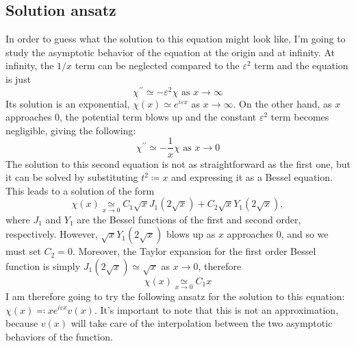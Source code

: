 \subsection{Solution ansatz}
In order to guess what the solution to this equation might look like, I'm going to study the asymptotic behavior of the equation at the origin and at infinity. At infinity, the \(1 / x\) term can be neglected compared to the \(\varepsilon ^2\) term and the equation is just
\begin{equation}
	\chi ^{\prime\prime} \simeq - \varepsilon ^2 \chi \text{ as } x \to \infty 
\end{equation}
Its solution is an exponential, \(\chi (x) \simeq e^{i \varepsilon x}\) as \(x \to \infty \). On the other hand, as \(x\) approaches \(0\), the potential term blows up and the constant \(\varepsilon ^2\) term becomes negligible, giving the following:
\begin{equation}
	\chi ^{\prime\prime} \simeq - \frac{1}{x} \chi \text{ as } x \to 0
\end{equation}
The solution to this second equation is not as straightforward as the first one, but it can be solved by substituting \(t^2\coloneqq x\) and expressing it as a Bessel equation. This leads to a solution of the form
\begin{equation}
	\chi (x) \underset{x \to 0}{\simeq} C_1 \sqrt{x} J_1 (2 \sqrt{x} ) + C_2 \sqrt{x} Y_1(2 \sqrt{x} ),
\end{equation}
where \(J_1\) and \(Y_1\) are the Bessel functions of the first and second order, respectively. However, \(\sqrt{x} Y_1 (2\sqrt{x} ) \) blows up as \(x\) approaches \(0\), and so we must set \(C_2 = 0\). Moreover, the Taylor expansion for the first order Bessel function is simply \(J_1 (2 \sqrt{x} ) \simeq \sqrt{x} \) as \(x \to 0\), therefore
\begin{equation}
	\chi (x) \underset{x \to 0}{\simeq} C_1x
\end{equation}
I am therefore going to try the following ansatz for the solution to this equation: \(\chi (x) \eqqcolon x e^{i\varepsilon x}v(x)\). It's important to note that this is not an approximation, because \(v(x)\) will take care of the interpolation between the two asymptotic behaviors of the function.

